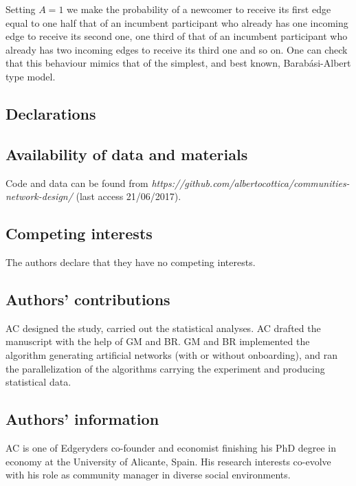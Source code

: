 \documentclass{bmcart}
\begin{document}
Setting $A = 1$ we make the probability of a newcomer to receive its first edge equal to one half that of an incumbent participant who already has one incoming edge to receive its second one, one third of that of an incumbent participant who already has two incoming edges to receive its third one and so on. One can check that this behaviour mimics that of the simplest, and best known, Barab\'asi-Albert type model. 


\begin{backmatter}

\section*{Declarations}

\subsection*{Availability of data and materials}
Code and data can be found from \emph{https://github.com/albertocottica/communities-network-design/} (last access 21/06/2017).

\subsection*{Competing interests}
  The authors declare that they have no competing interests.

\subsection*{Authors' contributions}
AC designed the study, carried out the statistical analyses. AC drafted the manuscript with the help of GM and BR. GM and BR implemented the algorithm generating artificial networks (with or without onboarding), and ran the parallelization of the algorithms carrying the experiment and producing statistical data.

\subsection*{Authors' information}
AC is one of Edgeryders co-founder and economist finishing his PhD degree in economy at the University of Alicante, Spain. His research interests co-evolve with his role as community manager in diverse social environments.


\end{backmatter}
\end{document}
